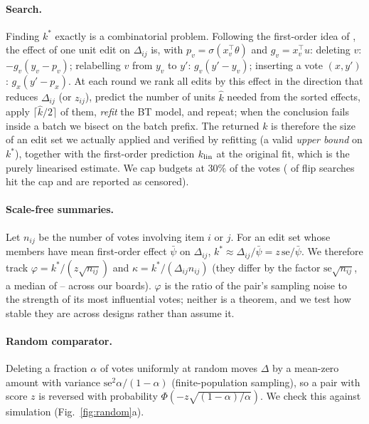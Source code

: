 \documentclass{article}
\newcommand{\nij}{n_{ij}}
\newcommand{\kstar}{k^\ast}
\begin{document}
\paragraph{Search.} Finding $\kstar$ exactly is a combinatorial problem. Following the first-order idea of \citet{broderick2020automatic}, the effect of one unit edit on $\Delta_{ij}$ is, with $p_v=\sigma(x_v^\top\theta)$ and $g_v=x_v^\top u$: deleting $v$: $-g_v(y_v-p_v)$; relabelling $v$ from $y_v$ to $y'$: $g_v(y'-y_v)$; inserting a vote $(x,y')$: $g_x(y'-p_x)$. At each round we rank all edits by this effect in the direction that reduces $\Delta_{ij}$ (or $z_{ij}$), predict the number of units $\hat k$ needed from the sorted effects, apply $\lceil \hat k/2\rceil$ of them, \emph{refit} the BT model, and repeat; when the conclusion fails inside a batch we bisect on the batch prefix. The returned $k$ is therefore the size of an edit set we actually applied and verified by refitting (a valid \emph{upper bound} on $\kstar$), together with the first-order prediction $k_{\rm lin}$ at the original fit, which is the purely linearised estimate. We cap budgets at 30\% of the votes (\Ncensfrac{} of flip searches hit the cap and are reported as censored).

\paragraph{Scale-free summaries.} Let $\nij$ be the number of votes involving item $i$ or $j$. For an edit set whose members have mean first-order effect $\bar\psi$ on $\Delta_{ij}$, $\kstar\approx\Delta_{ij}/\bar\psi=z\,\mathrm{se}/\bar\psi$. We therefore track $\varphi=\kstar/(z\sqrt{\nij})$ and $\kappa=\kstar/(\Delta_{ij}\nij)$ (they differ by the factor $\mathrm{se}\sqrt{\nij}$, a median of \Nsesqrtnmthuman--\Nsesqrtnnba{} across our boards). $\varphi$ is the ratio of the pair's sampling noise to the strength of its most influential votes; neither is a theorem, and we test how stable they are across designs rather than assume it.

\paragraph{Random comparator.} Deleting a fraction $\alpha$ of votes uniformly at random moves $\Delta$ by a mean-zero amount with variance $\mathrm{se}^2\alpha/(1-\alpha)$ (finite-population sampling), so a pair with score $z$ is reversed with probability $\Phi(-z\sqrt{(1-\alpha)/\alpha})$. We check this against simulation (Fig.~\ref{fig:random}a).
\end{document}
